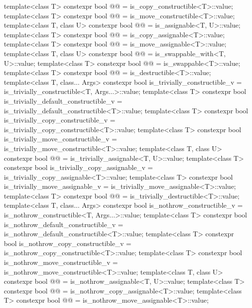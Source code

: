\begin{codeblock}
{  template<class T>
    constexpr bool @@ = is_copy_constructible<T>::value;
  template<class T>
    constexpr bool @@ = is_move_constructible<T>::value;
  template<class T, class U>
    constexpr bool @@ = is_assignable<T, U>::value;
  template<class T>
    constexpr bool @@ = is_copy_assignable<T>::value;
  template<class T>
    constexpr bool @@ = is_move_assignable<T>::value;
  template<class T, class U>
    constexpr bool @@ = is_swappable_with<T, U>::value;
  template<class T>
    constexpr bool @@ = is_swappable<T>::value;
  template<class T>
    constexpr bool @@ = is_destructible<T>::value;
  template<class T, class... Args>
    constexpr bool is_trivially_constructible_v = is_trivially_constructible<T, Args...>::value;
  template<class T>
    constexpr bool is_trivially_default_constructible_v
      = is_trivially_default_constructible<T>::value;
  template<class T>
    constexpr bool is_trivially_copy_constructible_v = is_trivially_copy_constructible<T>::value;
  template<class T>
    constexpr bool is_trivially_move_constructible_v = is_trivially_move_constructible<T>::value;
  template<class T, class U>
    constexpr bool @@ = is_trivially_assignable<T, U>::value;
  template<class T>
    constexpr bool is_trivially_copy_assignable_v = is_trivially_copy_assignable<T>::value;
  template<class T>
    constexpr bool is_trivially_move_assignable_v = is_trivially_move_assignable<T>::value;
  template<class T>
    constexpr bool @@ = is_trivially_destructible<T>::value;
  template<class T, class... Args>
    constexpr bool is_nothrow_constructible_v = is_nothrow_constructible<T, Args...>::value;
  template<class T>
    constexpr bool is_nothrow_default_constructible_v
      = is_nothrow_default_constructible<T>::value;
  template<class T>
    constexpr bool is_nothrow_copy_constructible_v = is_nothrow_copy_constructible<T>::value;
  template<class T>
    constexpr bool is_nothrow_move_constructible_v = is_nothrow_move_constructible<T>::value;
  template<class T, class U>
    constexpr bool @@ = is_nothrow_assignable<T, U>::value;
  template<class T>
    constexpr bool @@ = is_nothrow_copy_assignable<T>::value;
  template<class T>
    constexpr bool @@ = is_nothrow_move_assignable<T>::value;
}
\end{codeblock}
